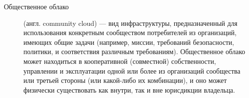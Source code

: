 \begin{description}
\item [Общественное облако] (англ. community cloud) — вид инфраструктуры, предназначенный для использования конкретным сообществом потребителей из организаций, имеющих общие задачи (например, миссии, требований безопасности, политики, и соответствия различным требованиям). Общественное облако может находиться в кооперативной (совместной) собственности, управлении и эксплуатации одной или более из организаций сообщества или третьей стороны (или какой-либо их комбинации), и оно может физически существовать как внутри, так и вне юрисдикции владельца.

\end{description}